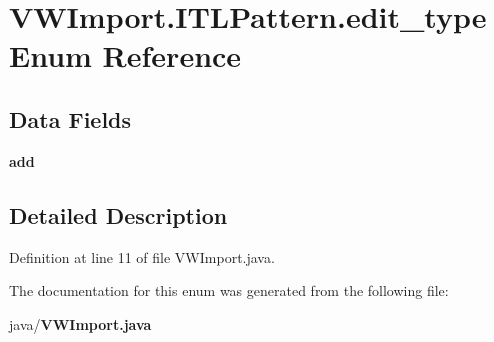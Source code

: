\section{V\-W\-Import.\-I\-T\-L\-Pattern.\-edit\-\_\-type Enum Reference}
\label{enumorg_1_1smallfoot_1_1vw4_1_1VWImport_1_1ITLPattern_1_1edit__type}
\subsection*{Data Fields}
\begin{DoxyCompactItemize}
\item 
{\bfseries add}\label{enumorg_1_1smallfoot_1_1vw4_1_1VWImport_1_1ITLPattern_1_1edit__type_a393e4cd5187ecf30d2db2129a73f3c05}

\end{DoxyCompactItemize}


\subsection{Detailed Description}


Definition at line 11 of file V\-W\-Import.\-java.



The documentation for this enum was generated from the following file\-:\begin{DoxyCompactItemize}
\item 
java/{\bf V\-W\-Import.\-java}\end{DoxyCompactItemize}
